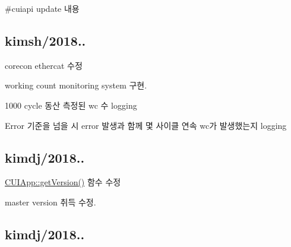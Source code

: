 \#cuiapi update 내용

\subsection*{kimsh/2018..}


\begin{DoxyEnumerate}
\item corecon ethercat 수정
\begin{DoxyItemize}
\item working count monitoring system 구현.
\item 1000 cycle 동산 측정된 wc 수 logging
\item Error 기준을 넘을 시 error 발생과 함께 몇 사이클 연속 wc가 발생했는지 logging
\end{DoxyItemize}
\end{DoxyEnumerate}

\subsection*{kimdj/2018..}


\begin{DoxyEnumerate}
\item \hyperlink{classCUIApp_a50b55afe3b66bc00cb1e2e34ed8db2b0}{C\-U\-I\-App\-::get\-Version()} 함수 수정
\begin{DoxyItemize}
\item master version 취득 수정.
\end{DoxyItemize}
\end{DoxyEnumerate}

\subsection*{kimdj/2018..}


